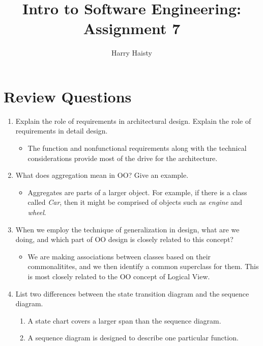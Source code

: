 \documentclass[11pt]{article}
\title{Intro to Software Engineering: Assignment 7}
\author{Harry Haisty}
\begin{document}
    \maketitle
    \section*{Review Questions}
    \begin{enumerate}
    
    \item Explain the role of requirements in architectural design. Explain the role of requirements in detail design. 
    \begin{itemize}
        \item[] The function and nonfunctional requirements along with the technical considerations provide most of the drive for the architecture. 
    \end{itemize}

    \item What does aggregation mean in OO? Give an example.
    \begin{itemize}
        \item[] Aggregates are parts of a larger object. For example, if there is a class called \textit{Car}, then it might be comprised of objects such as \textit{engine} 
        and \textit{wheel}.
    \end{itemize}

    \item When we employ the technique of generalization in design, what are we doing, and which part of OO design is closely related to this concept?
    \begin{itemize}
      \item[] We are making associations between classes based on their commonalitites, and we then identify a common superclass for them. 
      This is most closely related to the OO concept of Logical View.
    \end{itemize}

    \item List two differences between the state transition diagram and the sequence diagram.
    \begin{enumerate}
        \item[] A state chart covers a larger span than the sequence diagram.
        \item[] A sequence diagram is designed to describe one particular function.    
    \end{enumerate}
   

\end{enumerate}
\end{document}
